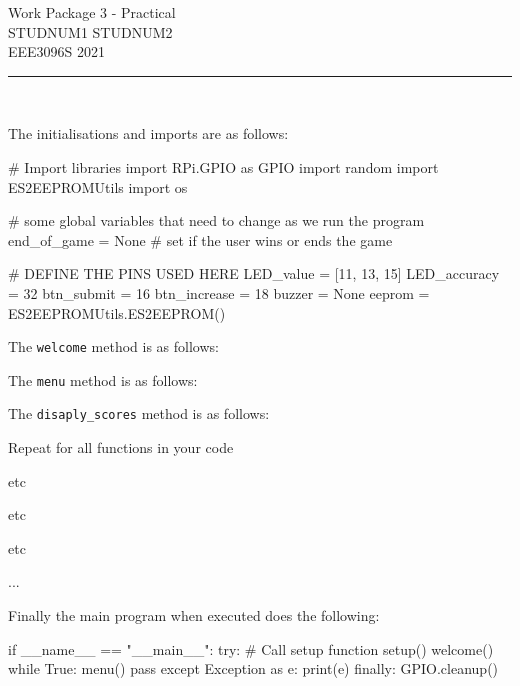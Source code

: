 

\begin{sloppypar}

\begin{center}
\huge Work Package 3 - Practical\\
\large STUDNUM1 STUDNUM2\\
\textsc{\Large EEE3096S 2021}\\
\rule{\linewidth}{0.2 mm} \\ 
\end{center}

The initialisations and imports are as follows:
\begin{python}
# Import libraries
import RPi.GPIO as GPIO
import random
import ES2EEPROMUtils
import os

# some global variables that need to change as we run the program
end_of_game = None  # set if the user wins or ends the game

# DEFINE THE PINS USED HERE
LED_value = [11, 13, 15]
LED_accuracy = 32
btn_submit = 16
btn_increase = 18
buzzer = None
eeprom = ES2EEPROMUtils.ES2EEPROM()
\end{python}

The \verb|welcome| method is as follows:
\begin{python}
\end{python}


The \verb|menu| method is as follows:
\begin{python}
\end{python}


The \verb|disaply_scores| method is as follows:
\begin{python}

\end{python}


Repeat for all functions in your code

etc

etc

etc

...


Finally the main program when executed does the following:
\begin{python}
if __name__ == "__main__":
    try:
        # Call setup function
        setup()
        welcome()
        while True:
            menu()
            pass
    except Exception as e:
        print(e)
    finally:
        GPIO.cleanup()
\end{python}

\end{sloppypar}


